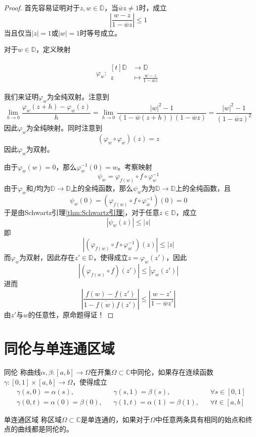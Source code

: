 \documentclass[lang = cn, scheme = chinese, thmcnt = section]{elegantbook}
\newcommand{\C}{\mathbb{C}}  		   %
\newcommand{\sub}{\subset}             %
\newcommand{\function}[5]{
	\begin{align*}
		#1:\begin{aligned}[t]
			#2 &\longrightarrow #3\\
			#4 &\longmapsto #5
		\end{aligned}
	\end{align*}
}                                     %
\begin{document}
\begin{proof}
	首先容易证明对于$z,w\in\overline{\mathbb{D}}$，当$\overline{w}z\ne1$时，成立
	$$
	\left|\frac{w-z}{1-\overline{w}z}\right|\le1
	$$
	当且仅当$|z|=1$或$|w|=1$时等号成立。
	
	对于$w\in\mathbb{D}$，定义映射
	\function{\varphi_w}{\mathbb{D}}{\mathbb{D}}{z}{\frac{w-z}{1-\overline{w}z}}
	我们来证明$\varphi_w$为全纯双射。注意到
	$$
	\lim_{h\to0}\frac{\varphi_w(z+h)-\varphi_w(z)}{h}=\lim_{h\to0}\frac{|w|^2-1}{(1-\overline{w}(z+h))(1-\overline{w}z)}=\frac{|w|^2-1}{(1-\overline{w}z)^2}
	$$
	因此$\varphi_w$为全纯映射。同时注意到
	$$
	(\varphi_w\circ\varphi_w)(z)=z
	$$
	因此$\varphi_w$为双射。
	
	由于$\varphi_w(w)=0$，那么$\varphi^{-1}_w(0)=w$。考察映射
	$$
	\psi_w=\varphi_{f(w)}\circ f \circ \varphi_w^{-1}
	$$
	由于$\varphi_w$和$f$均为$\mathbb{D}\to\mathbb{D}$上的全纯函数，那么$\psi_w$为为$\mathbb{D}\to\mathbb{D}$上的全纯函数，且
	$$
	\psi_w(0)=(\varphi_{f(w)}\circ f \circ \varphi_w^{-1})(0)=0
	$$
	于是由Schwartz引理\ref{thm:Schwartz引理}，对于任意$z\in\mathbb{D}$，成立
	$$
	|\psi_w(z)|\le|z|
	$$
	即
	$$
	|(\varphi_{f(w)}\circ f \circ \varphi_w^{-1})(z)|\le|z|
	$$
	而$\varphi_w$为双射，因此存在$z'\in\mathbb{D}$，使得成立$z=\varphi_w(z')$，因此
	$$
	|(\varphi_{f(w)}\circ f )(z')|\le|\varphi_w(z')|
	$$
	进而
	$$
	\left| \frac{f(w)-f(z')}{1-\overline{f(w)}f(z')} \right|
	\le
	\left| \frac{w-z'}{1-\overline{w}z'} \right|
	$$
	由$z'$与$w$的任意性，原命题得证！
\end{proof}

\section{同伦与单连通区域}

\begin{definition}{同伦}
	称曲线$\alpha,\beta:[a,b]\to \Omega$在开集$\Omega\sub\C$中同伦，如果存在连续函数$\gamma:[0,1]\times[a,b]\to \Omega$，使得成立
	\begin{align*}
		&\gamma(s,0)=\alpha(s),&&\gamma(s,1)=\beta(s),&&\forall s\in [0,1] \\
		&\gamma(0,t)=\alpha(0)=\beta(0),&&\gamma(1,t)=\alpha(1)=\beta(1),&& \forall t\in [a,b] 
	\end{align*}
\end{definition}

\begin{definition}{单连通区域}
	称区域$\Omega\sub\C$是单连通的，如果对于$\Omega$中任意两条具有相同的始点和终点的曲线都是同伦的。
\end{definition}
\end{document}
